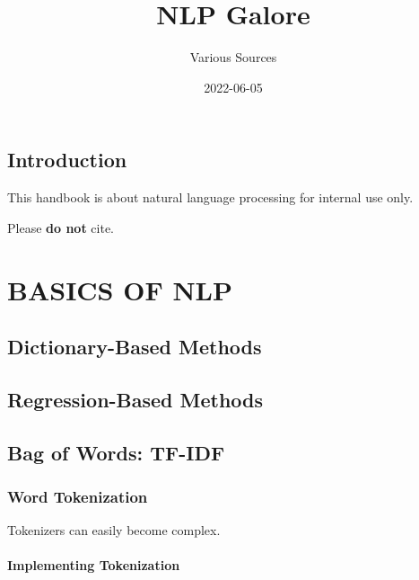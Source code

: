 \documentclass[
]{book}
\title{NLP Galore}
\author{Various Sources}
\date{2022-06-05}
\begin{document}
\maketitle

{
\setcounter{tocdepth}{1}
\tableofcontents
}
\hypertarget{introduction}{%
\chapter{Introduction}\label{introduction}}

This handbook is about natural language processing for internal use only.

Please \textbf{do not} cite.

\hypertarget{part-basics-of-nlp}{%
\part*{BASICS OF NLP}\label{part-basics-of-nlp}}

\hypertarget{dictionary-based-methods}{%
\chapter{Dictionary-Based Methods}\label{dictionary-based-methods}}

\hypertarget{regression-based-methods}{%
\chapter{Regression-Based Methods}\label{regression-based-methods}}

\hypertarget{bag-of-words-tf-idf}{%
\chapter{Bag of Words: TF-IDF}\label{bag-of-words-tf-idf}}

\hypertarget{word-tokenization}{%
\section{Word Tokenization}\label{word-tokenization}}

Tokenizers can easily become complex.

\hypertarget{implementing-tokenization}{%
\subsection{Implementing Tokenization}\label{implementing-tokenization}}
\end{document}
